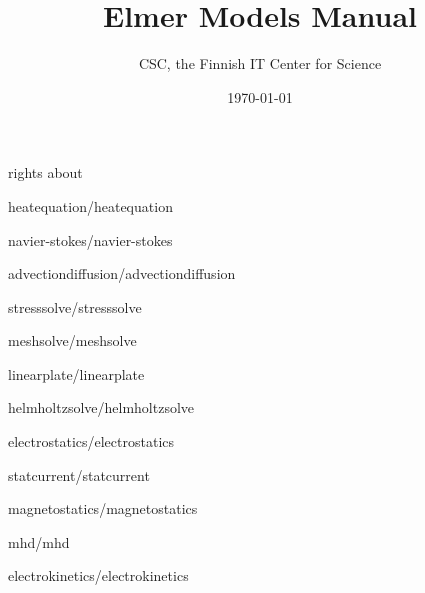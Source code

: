 \documentclass[a4paper,english]{report}    %
\title{\Huge{\bf Elmer Models Manual}}
\author{CSC, the Finnish IT Center for Science}
\date{\today}
\newcommand{\Include}{}
\begin{document}
\maketitle


\begin{versiona}
\Include{rights}
\Include{about}

\pagestyle{empty}

\setcounter{secnumdepth}{2}
\setcounter{tocdepth}{1}  

\tableofcontents
\end{versiona}



\renewcommand{\chaptername}{Model}
\newpage
\pagestyle{fancy}


\clearpage
{}

\graphicspath{{./}{heatequation/}}
\Include{heatequation/heatequation}

\graphicspath{{./}{navier-stokes/}}
\Include{navier-stokes/navier-stokes}

\graphicspath{{./}{advectiondiffusion/}}
\Include{advectiondiffusion/advectiondiffusion}

\graphicspath{{./}{stresssolve/}}
\Include{stresssolve/stresssolve}

\graphicspath{{./}{meshsolve/}}
\Include{meshsolve/meshsolve}

\graphicspath{{./}{linearplate/}}
\Include{linearplate/linearplate}



\graphicspath{{./}{helmholtzsolve/}}
\Include{helmholtzsolve/helmholtzsolve}

\graphicspath{{./}{electrostatics/}}
\Include{electrostatics/electrostatics}

\graphicspath{{./}{statcurrent/}}
\Include{statcurrent/statcurrent}

\graphicspath{{./}{magnetostatics/}}
\Include{magnetostatics/magnetostatics}

\graphicspath{{./}{mhd/}}
\Include{mhd/mhd}

\graphicspath{{./}{electrokinetics/}}
\Include{electrokinetics/electrokinetics}
\end{document}
